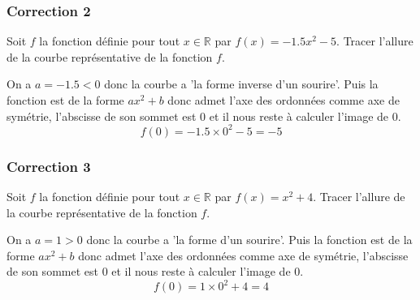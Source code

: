 \documentclass[15pt, mathserif]{beamer}
\newcommand{\R}{\mathbb{R}}			%
\begin{document}
\begin{frame}
\vspace{-10mm}
	\frametitle{Correction 2}
\vspace*{1cm} 
 Soit $f$ la fonction définie pour tout $x \in \R$ par $f(x)=-1.5x^2 -5$. Tracer l'allure de la courbe représentative de la fonction $f$. 
 
 \begin{multicols}{2} 
 On a $a=-1.5<0$ donc la courbe a 'la forme inverse d'un sourire'. Puis la fonction est de la forme $ax^2+b$ donc admet l'axe des ordonnées comme axe de symétrie, l'abscisse de son sommet est 0 et il nous reste à calculer l'image de 0. $$f(0)= -1.5\times 0^2-5=-5$$ 
 
  \columnbreak  
 
 \end{multicols} 
 \end{frame}


\begin{frame}
\vspace{-10mm}
	\frametitle{Correction 3}
\vspace*{1cm} 
 Soit $f$ la fonction définie pour tout $x \in \R$ par $f(x)=x^2 +4$. Tracer l'allure de la courbe représentative de la fonction $f$. 
 
 \begin{multicols}{2} 
 On a $a=1>0$ donc la courbe a 'la forme d'un sourire'. Puis la fonction est de la forme $ax^2+b$ donc admet l'axe des ordonnées comme axe de symétrie, l'abscisse de son sommet est 0 et il nous reste à calculer l'image de 0. $$f(0)= 1\times 0^2+4=4$$ 
 
  \columnbreak  
 
 \end{multicols} 
 \end{frame}
\end{document}
